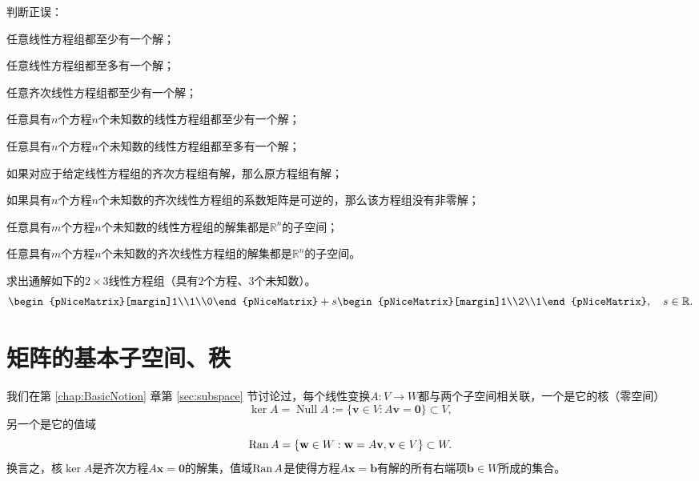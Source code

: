 \begin{problemset}
  \item 判断正误：
  \begin{probenumerate}
    \item 任意线性方程组都至少有一个解；
    \item 任意线性方程组都至多有一个解；
    \item 任意齐次线性方程组都至少有一个解；
    \item 任意具有$n$个方程$n$个未知数的线性方程组都至少有一个解；
    \item 任意具有$n$个方程$n$个未知数的线性方程组都至多有一个解；
    \item 如果对应于给定线性方程组的齐次方程组有解，那么原方程组有解；
    \item 如果具有$n$个方程$n$个未知数的齐次线性方程组的系数矩阵是可逆的，那么该方程组没有非零解；
    \item 任意具有$m$个方程$n$个未知数的线性方程组的解集都是$\mathbb{R}^n$的子空间；
    \item 任意具有$m$个方程$n$个未知数的齐次线性方程组的解集都是$\mathbb{R}^n$的子空间。
  \end{probenumerate}
  \item 求出通解如下的$2\times 3$线性方程组（具有$2$个方程、$3$个未知数）。
  \[\begin{pNiceMatrix}[margin]1\\1\\0\end{pNiceMatrix}+s\begin{pNiceMatrix}[margin]1\\2\\1\end{pNiceMatrix},\quad s\in\mathbb{R}.\]
\end{problemset}

\section{矩阵的基本子空间、秩}\label{sec:fundamental_subspace}

我们在第 \ref{chap:BasicNotion} 章第 \ref{sec:subspace} 节讨论过，每个线性变换$A:V\to W$都与两个子空间相关联，一个是它的核（零空间）\[\ker A=\operatorname{Null}A:=\{\mathbf{v}\in V:A\mathbf{v}=\mathbf{0}\}\subset V,\]
另一个是它的值域\[\operatorname{Ran} A=\{\mathbf{w}\in W:\mathbf{w}=A\mathbf{v},\mathbf{v}\in V\}\subset W.\]
换言之，核$\ker A$是齐次方程$A\mathbf{x}=\mathbf{0}$的解集，值域$\operatorname{Ran} A$是使得方程$A\mathbf{x}=\mathbf{b}$有解的所有右端项$\mathbf{b}\in W$所成的集合。

